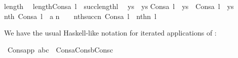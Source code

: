 \begin{isabelle}%
length{\isacharparenleft}{\kern0pt}{\isacharbrackleft}{\kern0pt}{\isacharbrackright}{\kern0pt}{\isacharparenright}{\kern0pt}\ {\isacharequal}{\kern0pt}\ {}\isasep\isanewline%
length{\isacharparenleft}{\kern0pt}Cons{\isacharparenleft}{\kern0pt}a{\isacharcomma}{\kern0pt}\ l{\isacharparenright}{\kern0pt}{\isacharparenright}{\kern0pt}\ {\isacharequal}{\kern0pt}\ succ{\isacharparenleft}{\kern0pt}length{\isacharparenleft}{\kern0pt}l{\isacharparenright}{\kern0pt}{\isacharparenright}{\kern0pt}\isasep\isanewline\isanewline%
{\isacharbrackleft}{\kern0pt}{\isacharbrackright}{\kern0pt}\ {\isacharat}{\kern0pt}\ ys\ {\isacharequal}{\kern0pt}\ ys\isasep\isanewline%
Cons{\isacharparenleft}{\kern0pt}a{\isacharcomma}{\kern0pt}\ l{\isacharparenright}{\kern0pt}\ {\isacharat}{\kern0pt}\ ys\ {\isacharequal}{\kern0pt}\ Cons{\isacharparenleft}{\kern0pt}a{\isacharcomma}{\kern0pt}\ l\ {\isacharat}{\kern0pt}\ ys{\isacharparenright}{\kern0pt}\isasep\isanewline\isanewline%
nth{\isacharparenleft}{\kern0pt}{}{\isacharcomma}{\kern0pt}\ Cons{\isacharparenleft}{\kern0pt}a{\isacharcomma}{\kern0pt}\ l{\isacharparenright}{\kern0pt}{\isacharparenright}{\kern0pt}\ {\isacharequal}{\kern0pt}\ a\isasep\isanewline%
n\ {\isasymin}\ {\isasymomega}\ {\isasymLongrightarrow}\ nth{\isacharparenleft}{\kern0pt}succ{\isacharparenleft}{\kern0pt}n{\isacharparenright}{\kern0pt}{\isacharcomma}{\kern0pt}\ Cons{\isacharparenleft}{\kern0pt}a{\isacharcomma}{\kern0pt}\ l{\isacharparenright}{\kern0pt}{\isacharparenright}{\kern0pt}\ {\isacharequal}{\kern0pt}\ nth{\isacharparenleft}{\kern0pt}n{\isacharcomma}{\kern0pt}\ l{\isacharparenright}{\kern0pt}%
\end{isabelle}%
We have the usual Haskell-like notation for iterated applications
of :%
\begin{isabelle}
\isamarkupfalse%
\ Cons{\isacharunderscore}{\kern0pt}app{\isacharcolon}{\kern0pt}\ {\isachardoublequoteopen}{\isacharbrackleft}{\kern0pt}a{\isacharcomma}{\kern0pt}b{\isacharcomma}{\kern0pt}c{\isacharbrackright}{\kern0pt}\ {\isacharequal}{\kern0pt}\ Cons{\isacharparenleft}{\kern0pt}a{\isacharcomma}{\kern0pt}Cons{\isacharparenleft}{\kern0pt}b{\isacharcomma}{\kern0pt}Cons{\isacharparenleft}{\kern0pt}c{\isacharcomma}{\kern0pt}{\isacharbrackleft}{\kern0pt}{\isacharbrackright}{\kern0pt}{\isacharparenright}{\kern0pt}{\isacharparenright}{\kern0pt}{\isacharparenright}{\kern0pt}{\isachardoublequoteclose}%
\end{isabelle}

